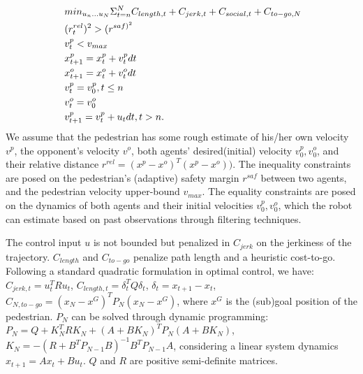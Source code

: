 \documentclass[conference]{IEEEtran}
\begin{document}
\begin{equation}~\label{eq:receding_control}
  \begin{aligned}
    &min_{u_n \dots u_N} \Sigma^N_{t=n} \small{C_{length,t} + C_{jerk,t} + C_{social,t}} + C_{to-go,N}\\
    & (r^{rel}_t)^2 > (r^{{saf})^2}\\
    & v^p_t < v_{max}\\
    & x^p_{t+1} = x^p_t + v^p_t \scriptsize{d}t\\
    & x^o_{t+1} = x^o_t + v^o_t \scriptsize{d}t\\
    & v^p_t = v^p_0, t \leq n\\
    & v^o_t = v^o_0\\
    & v^p_{t+1} = v^p_t + u_t \scriptsize{d}t, t>n.
 \end{aligned}
\end{equation}
We assume that the pedestrian has some rough estimate of 
his/her own velocity $v^p$, the opponent's velocity $v^o$, both agents' 
desired(initial) velocity $v^p_0, v^o_0$, and their relative distance 
$r^{rel} = (x^p-x^o)^T(x^p-x^o))$.
The inequality constraints are posed on the pedestrian's (adaptive) safety margin 
$r^{saf}$ between two 
agents, and the pedestrian velocity upper-bound $v_{max}$. 
The equality constraints are posed on the 
dynamics of both agents and their initial velocities 
$v^p_0, v^o_0$, which the robot can estimate based on past 
observations through filtering techniques. 

The control input $u$ is not bounded but 
penalized in $C_{jerk}$ on the jerkiness of the trajectory. 
$C_{length}$ and $C_{to-go}$ penalize path length and a heuristic cost-to-go. 
Following a standard quadratic formulation in optimal control, we have: $C_{jerk,t}=u_t^TRu_t$, 
$C_{length,t}=\delta_t^TQ\delta_t$, $\delta_t = x_{t+1}-x_t$, 
$C_{N,to-go} = (x_N-x^G)^TP_N(x_N-x^G)$, where $x^G$ is the (sub)goal 
position of the pedestrian. $P_N$ can be solved through dynamic programming:
$P_N = Q + K_N^TRK_N + (A+BK_N)^TP_N(A+BK_N)$, 
$K_N = -(R+B^TP_{N-1}B)^{-1}B^TP_{N-1}A$, considering a linear system dynamics
$x_{t+1}= Ax_t+Bu_t$. $Q$ and $R$ are positive semi-definite matrices. 
\end{document}
